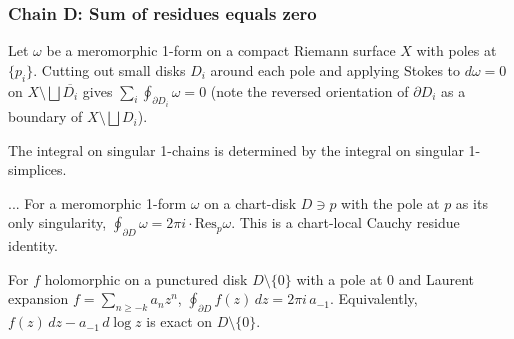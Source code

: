 \subsubsection*{Chain D: Sum of residues equals zero}

\begin{lemma}
\label{lem:srt-r1-stokes-cut-disks}
Let $\omega$ be a meromorphic 1-form on a compact Riemann
surface $X$ with poles at $\{p_{i}\}$.  Cutting out small
disks $D_{i}$ around each pole and applying Stokes to
$d\omega = 0$ on $X \setminus \bigsqcup \overline{D_{i}}$ gives
$\sum_{i} \oint_{\partial D_{i}} \omega = 0$ (note the reversed
orientation of $\partial D_{i}$ as a boundary of $X \setminus
\bigsqcup D_{i}$).
\leanok
\end{lemma}
\begin{lemma}[Pass A.1: reduce to one-variable, $q=1$]
\label{lem:srt-r1}
The integral on singular 1-chains is determined by the integral on singular 1-simplices.
\leanok
\end{lemma}

\begin{lemma}
...
\label{lem:srt-r2-residue-as-boundary}
For a meromorphic 1-form $\omega$ on a chart-disk $D \ni p$
with the pole at $p$ as its only singularity,
$\oint_{\partial D} \omega = 2\pi i \cdot \mathrm{Res}_{p}\omega$.
This is a chart-local Cauchy residue identity.
\leanok
\end{lemma}

\begin{lemma}
\label{lem:srt-r3-cauchy-formula-disk}
For $f$ holomorphic on a punctured disk $D \setminus \{0\}$
with a pole at $0$ and Laurent expansion
$f = \sum_{n \geq -k} a_{n} z^{n}$,
$\oint_{\partial D} f(z)\,dz = 2\pi i\,a_{-1}$.  Equivalently,
$f(z)\,dz - a_{-1}\,d\log z$ is exact on $D \setminus \{0\}$.
\leanok
\end{lemma}

